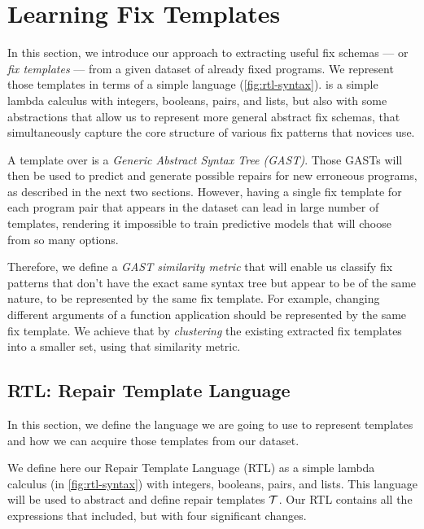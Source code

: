 \section{Learning Fix Templates}
\label{sec:templ-cluster}

In this section, we introduce our approach to extracting useful fix schemas ---
or \emph{fix templates} --- from a given dataset of already fixed programs. We
represent those templates in terms of a simple language \repairLang
(\autoref{fig:rtl-syntax}). \repairLang is a simple lambda calculus with integers,
booleans, pairs, and lists, but also with some abstractions that allow us to
represent more general abstract fix schemas, that simultaneously capture the
core structure of various fix patterns that novices use.

A template over \repairLang is a \emph{Generic Abstract Syntax Tree (GAST)}.
Those GASTs will then be used to predict and generate possible repairs for new
erroneous programs, as described in the next two sections. However, having a
single fix template for each program pair that appears in the dataset can lead
in large number of templates, rendering it impossible to train predictive models
that will choose from so many options.

Therefore, we define a \emph{GAST similarity metric} that will enable us
classify fix patterns that don't have the exact same syntax tree but appear to
be of the same nature, to be represented by the same fix template. For example,
changing different arguments of a function application should be represented by
the same fix template. We achieve that by \emph{clustering} the existing
extracted fix templates into a smaller set, using that similarity metric.



\subsection{RTL: Repair Template Language}
\label{subsec:lang}

In this section, we define the language we are going to use to represent
templates and how we can acquire those templates from our dataset.

We define here our Repair Template Language (RTL) as a simple lambda calculus
(\repairLang in \autoref{fig:rtl-syntax}) with integers, booleans, pairs, and lists.
This language will be used to abstract and define repair templates $\mathcal{T}$. Our RTL
contains all the expressions that \lang included, but with four significant
changes.

